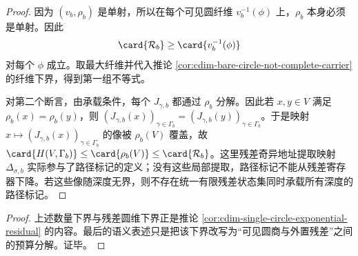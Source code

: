 \begin{proof}
因为 \((v_b,\rho_b)\) 是单射，所以在每个可见圆纤维
\(v_b^{-1}(\phi)\) 上，\(\rho_b\) 本身必须是单射。因此
\[
\card{\mathcal R_b}\ge \card{v_b^{-1}(\phi)}
\]
对每个 \(\phi\) 成立。取最大纤维并代入推论
\ref{cor:cdim-bare-circle-not-complete-carrier} 的纤维下界，得到第一组不等式。

对第二个断言，由承载条件，每个 \(J_{\gamma,b}\) 都通过 \(\rho_b\) 分解。因此若
\(x,y\in V\) 满足 \(\rho_b(x)=\rho_b(y)\)，则
\((J_{\gamma,b}(x))_{\gamma\in\Gamma_b}=(J_{\gamma,b}(y))_{\gamma\in\Gamma_b}\)。于是映射
\(x\mapsto (J_{\gamma,b}(x))_{\gamma\in\Gamma_b}\) 的像被 \(\rho_b(V)\) 覆盖，故
\(\card{H(V,\Gamma_b)}\le\card{\rho_b(V)}\le\card{\mathcal R_b}\)。这里残差奇异地址提取映射
\(\Delta_{\sigma,b}\) 实际参与了路径标记的定义；没有这些局部提取，路径标记不能从残差寄存器下降。若这些像随深度无界，则不存在统一有限残差状态集同时承载所有深度的路径标记。
\end{proof}

\begin{proof}
上述数量下界与残差圆维下界正是推论 \ref{cor:cdim-single-circle-exponential-residual} 的内容。最后的语义表述只是把该下界改写为“可见圆商与外置残差”之间的预算分解。证毕。
\end{proof}
